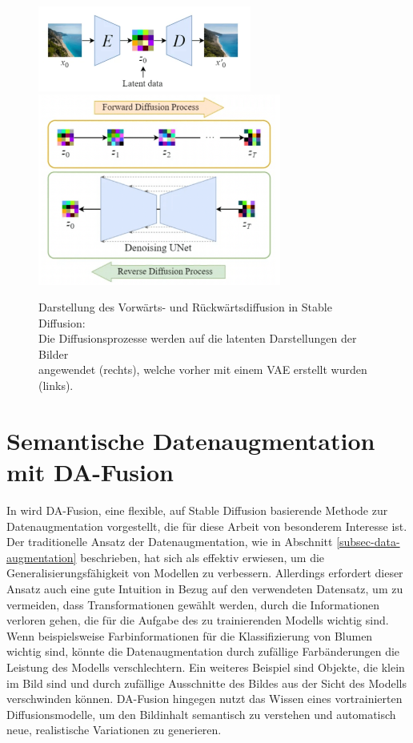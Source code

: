 \begin{figure}[h] %
	\centering
	\includegraphics[width=7cm]{figure_stable-diffusion_vae.png}%
	\includegraphics[width=8cm]{figure_stable-diffusion_latent.png}
	\caption{Darstellung des Vorwärts- und Rückwärtsdiffusion in Stable Diffusion:\\
		Die	Diffusionsprozesse werden auf die latenten Darstellungen der Bilder\\
		angewendet (rechts), welche vorher mit einem VAE erstellt wurden (links).}
	\label{fig:stable-diffusion}
\end{figure}

\section{Semantische Datenaugmentation mit DA-Fusion} \label{sec:da-fusion}

In \parencite{Trabucco2023dafusion} wird DA-Fusion, eine flexible, auf Stable Diffusion basierende Methode zur Datenaugmentation vorgestellt, die für diese Arbeit von besonderem Interesse ist. Der traditionelle Ansatz der Datenaugmentation, wie in Abschnitt \ref{subsec-data-augmentation} beschrieben, hat sich als effektiv erwiesen, um die Generalisierungsfähigkeit von Modellen zu verbessern. Allerdings erfordert dieser Ansatz auch eine gute Intuition in Bezug auf den verwendeten Datensatz, um zu vermeiden, dass Transformationen gewählt werden, durch die Informationen verloren gehen, die für die Aufgabe des zu trainierenden Modells wichtig sind. Wenn beispielsweise Farbinformationen für die Klassifizierung von Blumen wichtig sind, könnte die Datenaugmentation durch zufällige Farbänderungen die Leistung des Modells verschlechtern. Ein weiteres Beispiel sind Objekte, die klein im Bild sind und durch zufällige Ausschnitte des Bildes aus der Sicht des Modells verschwinden können. DA-Fusion hingegen nutzt das Wissen eines vortrainierten Diffusionsmodelle, um den Bildinhalt semantisch zu verstehen und automatisch neue, realistische Variationen zu generieren.

